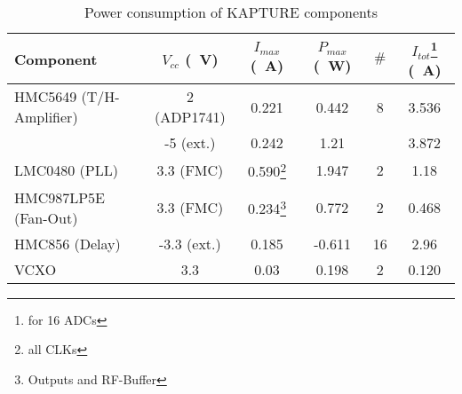 \begin{table}[tbh!]
	\caption{Power consumption of KAPTURE components}
	\label{tab:kapturecomp}
	\begin{minipage}{\textwidth}
	\centering
	\begin{tabularx}{\textwidth}{lccccc}
		\toprule
		\textbf{Component} & \textbf{$V_{cc}$ (\SI{}{\volt})} & \textbf{$I_{max}$ (\SI{}{\ampere})} & \textbf{$P_{max}$ (\SI{}{\watt})} & $\#$ & \textbf{$I_{tot}$}\footnote{for 16 ADCs} (\SI{}{\ampere})\\
			\midrule
		HMC5649 (T/H-Amplifier) 	& 2 (ADP1741) & 0.221 & 0.442 & 8 & 3.536\\
								& -5 (ext.) & 0.242 & 1.21 &  & 3.872\\
		LMC0480 (PLL) 			& 3.3 (FMC) & 0.590\footnote{all CLKs} & 1.947 & 2 & 1.18\\
		HMC987LP5E (Fan-Out) 	& 3.3 (FMC) & 0.234\footnote{ Outputs and RF-Buffer} & 0.772 & 2 & 0.468\\
		HMC856 (Delay) 			& -3.3 (ext.) & 0.185 & -0.611 & 16 & 2.96\\
		VCXO 					& 3.3 & 0.03 & 0.198 & 2 & 0.120\\
		\bottomrule
		\end{tabularx}
	\end{minipage}
\end{table}

